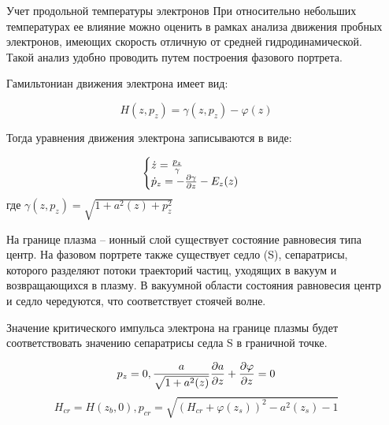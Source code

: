 \begin{frame}[t]{}
\begin{columns}[t]
\begin{column}{.48\linewidth}
  	\end{column}
      \begin{column}{.48\linewidth}

        \begin{block}{Учет продольной температуры электронов}
            При относительно небольших температурах ее влияние можно оценить в рамках анализа движения пробных электронов, имеющих скорость отличную от средней гидродинамической. Такой анализ удобно проводить путем построения фазового портрета. 

            Гамильтониан движения электрона имеет вид:

            \begin{equation}
                H(z,p_z)=\gamma(z,p_z)-\varphi(z)
            \end{equation}

            \vspace{0.6em}
            Тогда уравнения движения электрона записываются в виде:

                \begin{center}
                    \begin{equation}
                    \begin{cases}
                    	\dot z={{p_z}\over{\gamma}} \\
                    	\dot p_z=-\frac{\partial\gamma}{\partial z}-E_z(z) \\

                    \end{cases}  
                    \end{equation}
                    \vspace{0.6em}
                    где $\gamma(z,p_z)=\sqrt{1+a^2(z)+p_z^2}$
                \end{center}
\vspace{0.6em}
                 На границе плазма -- ионный слой существует состояние равновесия типа центр. На фазовом портрете также существует седло (S), сепаратрисы, которого разделяют потоки траекторий частиц, уходящих в вакуум и возвращающихся в плазму. В вакуумной области состояния равновесия центр и седло чередуются, что соответствует стоячей волне.
                
                Значение критического импульса электрона на границе плазмы будет соответствовать значению сепаратрисы седла S в граничной точке. 

                \begin{equation}
                	p_z=0, {{a}\over{\sqrt{1+a^2(z)}}}\frac{\partial a}{\partial z}+\frac{\partial\varphi}{\partial z}=0
                \end{equation}
\vspace{0.6em}
                \begin{equation}
                	H_{cr}=H(z_b,0), p_{cr}=\sqrt{(H_{cr}+\varphi(z_s))^2-a^2(z_s)-1}
                \end{equation}


\end{block}
\end{column}
\end{columns}
\end{frame}
